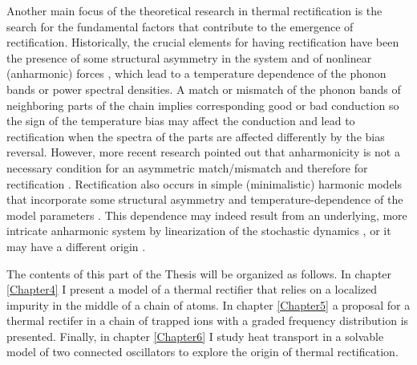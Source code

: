 Another main focus of the theoretical research in thermal rectification is the search for the fundamental factors that contribute to the emergence of rectification. Historically, the crucial elements for having rectification have been the presence of some structural asymmetry in the system and of nonlinear (anharmonic) forces \cite{Zeng2008,Katz2016,Li2008,Hu2006,Benenti2016,Li2012,Segal2005,Segal2005b}, which lead to a temperature dependence of the phonon bands or power spectral densities. A match or mismatch of the phonon bands of neighboring parts of the chain implies corresponding good or bad conduction so the
sign of the temperature bias may affect the conduction and lead to rectification when the spectra of the parts are affected differently by the bias reversal. However, more recent research pointed out that anharmonicity is not a necessary condition for an asymmetric match/mismatch and therefore for rectification \cite{Pereira2017}. Rectification also occurs in simple (minimalistic) harmonic models that incorporate some structural asymmetry and temperature-dependence of the model parameters \cite{Pereira2017}. This dependence may indeed result from an underlying, more intricate  anharmonic system by linearization of the stochastic dynamics \cite{Pereira2017,Pereira2019}, or it may have a different origin \cite{Simon2019}.


The contents of this part of the Thesis will be organized as follows. In chapter \ref{Chapter4} I present a model of a thermal rectifier that relies on a localized impurity in the middle of a chain of atoms. In chapter \ref{Chapter5} a proposal for a thermal rectifer in a chain of trapped ions with a graded frequency distribution is presented. Finally, in chapter \ref{Chapter6} I study heat transport in a solvable model of two connected oscillators to explore the origin of thermal rectification.
